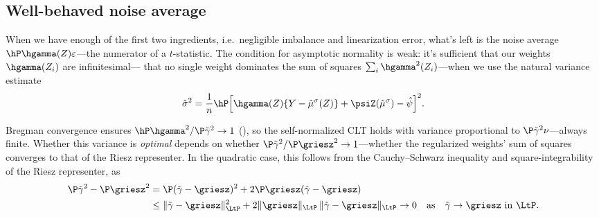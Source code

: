 \documentclass{article}
\begin{document}
\subsection{Well-behaved noise average}
\label{sec:noise-convergence}
When we have enough of the first two ingredients,
i.e.\ negligible imbalance and linearization error,
what's left is the noise average
$\hP \hgamma(Z) \varepsilon$---the numerator of a $t$-statistic.
The condition for asymptotic normality is weak\footnotemark:
it's sufficient that our weights $\hgamma(Z_i)$ are infinitesimal---
that no single weight dominates
the sum of squares $\sum_i \hgamma^2(Z_i)$---when
we use the natural variance estimate
\begin{equation}\label{eq:variance-estimate}
\hat\sigma^2
  = \frac{1}{n}\hP \qty[\hgamma(Z)\qty{Y - \hat\mu^\sigma(Z)}
    + \psiZ(\hat\mu^\sigma) - \hat\psi]^2.
\end{equation}%

Bregman convergence ensures
$\hP \hgamma^2 / \P \tilde\gamma^2 \to 1$
(),
so the self-normalized CLT holds
with variance proportional to
$\P\tilde\gamma^2\nu$---always finite.
Whether this variance is \emph{optimal}
depends on whether
$\P\tilde\gamma^2 / \P \griesz^2 \to 1$---whether
the regularized weights' sum of squares
converges to that of the Riesz representer.
In the quadratic case,
this follows from the Cauchy--Schwarz inequality
and square-integrability of the Riesz representer, as
\begin{equation*}
\begin{aligned}
\P \tilde\gamma^2 - \P \griesz^2
&= \P(\tilde\gamma - \griesz)^2
+ 2\P \griesz(\tilde\gamma - \griesz) \\
&\le \|\tilde\gamma - \griesz\|_{\LtP}^2
+ 2\|\griesz\|_{\LtP}\,
\|\tilde\gamma - \griesz\|_{\LtP}
\to 0 \qqtext{as} \tilde\gamma \to \griesz
  \text{ in } \LtP.
\end{aligned}
\end{equation*}
\end{document}
